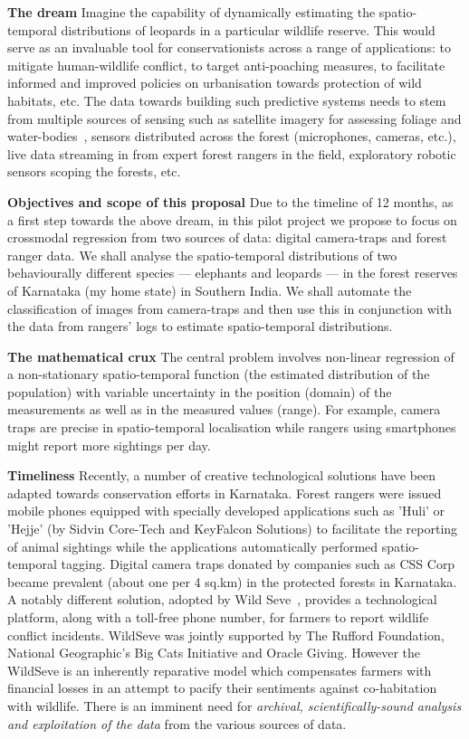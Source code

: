 \documentclass[a4paper,10pt,twocolumn]{article}
\newcommand{\hdg}[1] {\noindent \textbf{#1} }
\begin{document}
\hdg{The dream}
Imagine the capability of dynamically estimating the spatio-temporal distributions of leopards in a particular wildlife reserve. This would serve as an invaluable tool for conservationists across a range of applications: to mitigate human-wildlife conflict, to target anti-poaching measures, to facilitate informed and improved policies on urbanisation towards protection of wild habitats, etc. The data towards building such predictive systems needs to stem from multiple sources of sensing such as satellite imagery for assessing foliage and water-bodies~\cite{urthecast}, sensors distributed across the forest (microphones, cameras, etc.), live data streaming in from expert forest rangers in the field, exploratory robotic sensors scoping the forests, etc. 

\hdg{Objectives and scope of this proposal} 
Due to the timeline of 12 months,  as a first step towards the above dream, in this pilot project we propose to focus on crossmodal regression from two sources of data: digital camera-traps and forest ranger data. We shall analyse the spatio-temporal distributions of two behaviourally different species --- elephants and leopards --- in the forest reserves of Karnataka (my home state) in Southern India. We shall automate the classification of images from camera-traps and then use this in conjunction with the data from rangers' logs to estimate spatio-temporal distributions.

\hdg{The mathematical crux} The central problem involves non-linear regression of a non-stationary spatio-temporal function (the estimated distribution of the population) with variable uncertainty in the position (domain) of the measurements as well as in the measured values (range). For example, camera traps are precise in spatio-temporal localisation while rangers using smartphones might report more sightings per day. 

\hdg{Timeliness}
Recently, a number of creative technological solutions have been adapted towards conservation efforts in Karnataka. Forest rangers were issued mobile phones equipped with specially developed applications such as 'Huli' or 'Hejje' (by Sidvin Core-Tech and KeyFalcon Solutions) to facilitate the reporting of animal sightings while the applications automatically performed spatio-temporal tagging. Digital camera traps donated by companies such as CSS Corp became prevalent (about one per 4 sq.km) in the protected forests in Karnataka. A notably different solution, adopted by Wild Seve~\cite{wildseve}, provides a technological platform, along with a toll-free phone number, for farmers to report wildlife conflict incidents. WildSeve was jointly supported by The Rufford Foundation, National Geographic's Big Cats Initiative and Oracle Giving. However the WildSeve is an inherently reparative model which compensates farmers with financial losses in an attempt to pacify their sentiments against co-habitation with wildlife. There is an imminent need for \textit{archival, scientifically-sound analysis and exploitation of the data} from the various sources of data. 
\end{document}
